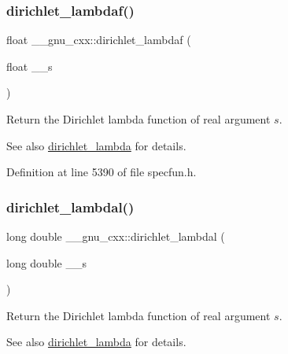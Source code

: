 \subsubsection{\texorpdfstring{dirichlet\+\_\+lambdaf()}{dirichlet\_lambdaf()}}
{\footnotesize\ttfamily float \+\_\+\+\_\+gnu\+\_\+cxx\+::dirichlet\+\_\+lambdaf (\begin{DoxyParamCaption}\item[{float}]{\+\_\+\+\_\+s }\end{DoxyParamCaption})\hspace{0.3cm}{\ttfamily [inline]}}

Return the Dirichlet lambda function of real argument $ s $.

\begin{DoxySeeAlso}{See also}
\hyperlink{group__gnu__math__spec__func_ga06842a81bdcabf9c62252dde992d42ee}{dirichlet\+\_\+lambda} for details. 
\end{DoxySeeAlso}


Definition at line 5390 of file specfun.\+h.

\mbox{\label{group__gnu__math__spec__func_gab28d06c4e3c7457f1fa3663168678fb2}} 
\subsubsection{\texorpdfstring{dirichlet\+\_\+lambdal()}{dirichlet\_lambdal()}}
{\footnotesize\ttfamily long double \+\_\+\+\_\+gnu\+\_\+cxx\+::dirichlet\+\_\+lambdal (\begin{DoxyParamCaption}\item[{long double}]{\+\_\+\+\_\+s }\end{DoxyParamCaption})\hspace{0.3cm}{\ttfamily [inline]}}

Return the Dirichlet lambda function of real argument $ s $.

\begin{DoxySeeAlso}{See also}
\hyperlink{group__gnu__math__spec__func_ga06842a81bdcabf9c62252dde992d42ee}{dirichlet\+\_\+lambda} for details. 
\end{DoxySeeAlso}


